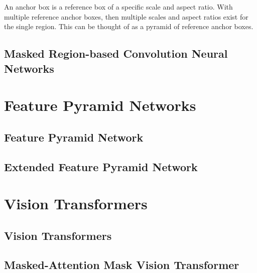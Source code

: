 \newpage
An anchor box is a reference box of a specific scale and aspect ratio. With multiple reference anchor boxes, then multiple scales and aspect ratios exist 
for the single region. This can be thought of as a pyramid of reference anchor boxes. 



\subsection{Masked Region-based Convolution Neural Networks}


\section{Feature Pyramid Networks}


\subsection{Feature Pyramid Network}


\subsection{Extended Feature Pyramid Network}



\section{Vision Transformers}

\subsection{Vision Transformers}


\subsection{Masked-Attention Mask Vision Transformer}
